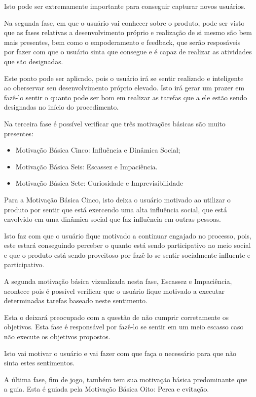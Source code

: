 Isto pode ser extremamente importante para conseguir capturar novos usuários.

Na segunda fase, em que o usuário vai conhecer sobre o produto, pode ser visto
que as fases relativas a desenvolvimento próprio e realização de si mesmo
são bem mais presentes, bem como o empoderamento e feedback, que serão
resposáveis por fazer com que o usuário sinta que consegue e é capaz
de realizar as atividades que são designadas.

Este ponto pode ser aplicado, pois o usuário irá se sentir realizado e inteligente
ao oberservar seu desenvolvimento próprio elevado. Isto irá gerar um prazer em fazê-lo
sentir o quanto pode ser bom em realizar as tarefas que a ele estão sendo designadas
no início do procedimento.

Na terceira fase é possível verificar que três motivações básicas são muito presentes:

\begin{itemize}
    \item Motivação Básica Cinco: Influência e Dinâmica Social;
    \item Motivação Básica Seis: Escassez e Impaciência.
    \item Motivação Básica Sete: Curiosidade e Imprevisibilidade
\end{itemize}


Para a Motivação Básica Cinco, isto deixa o usuário motivado ao utilizar o produto
por sentir que está exercendo uma alta influência social, que está envolvido em
uma dinâmica social que faz influência em outras pessoas.

Isto faz com que o usuário fique motivado a continuar engajado no processo, pois,
este estará conseguindo perceber o quanto está sendo participativo no meio social
e que o produto está sendo proveitoso por fazê-lo se sentir socialmente influente
e participativo.


A segunda motivação básica vizualizada nesta fase, Escassez e Impaciência, acontece
pois é possível verificar que o usuário fique motivado a executar determinadas
tarefas baseado neste sentimento.

Esta o deixará preocupado com a questão de não cumprir corretamente os objetivos.
Esta fase é responsável por fazê-lo se sentir em um meio escasso caso não execute
os objetivos propostos.

Isto vai motivar o usuário e vai fazer com que faça o necessário para que não
sinta estes sentimentos.

A última fase, fim de jogo, também tem sua motivação básica predominante que
a guia. Esta é guiada pela Motivação Básica Oito: Perca e evitação.

